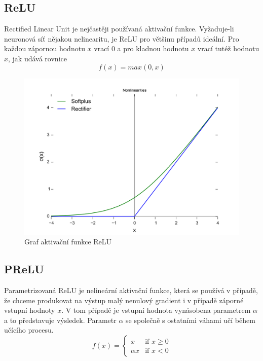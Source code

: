 \subsection*{ReLU}
Rectified Linear Unit je nejčastěji používaná aktivační funkce. Vyžaduje-li neuronová síť nějakou nelinearitu, je ReLU pro většinu případů ideální. Pro každou zápornou hodnotu $x$ vrací $0$ a pro kladnou hodnotu $x$ vrací tutéž hodnotu $x$, jak udává rovnice 
\begin{equation}
   f(x)=max(0,x)
\end{equation}

\begin{figure}[H]
    \centering
    \includegraphics[scale=0.2]{obrazky-figures/ReLU.png}
    \caption{\label{fig:relu}Graf aktivační funkce ReLU}
\end{figure}


\subsection*{PReLU}
Parametrizovaná ReLU je nelineární aktivační funkce, která se používá v případě, že chceme produkovat na výstup malý nenulový gradient i v případě záporné vstupní hodnoty $x$. V tom případě je vstupní hodnota vynásobena parametrem $\alpha$ a to představuje výsledek. Parametr $\alpha$ se společně s ostatními váhami učí během učícího procesu.
\begin{equation}
  f(x) =
  \begin{cases}
    x & \text{if } x \geq 0 \\
    {\alpha}x & \text{if } x < 0
  \end{cases}
\end{equation}

